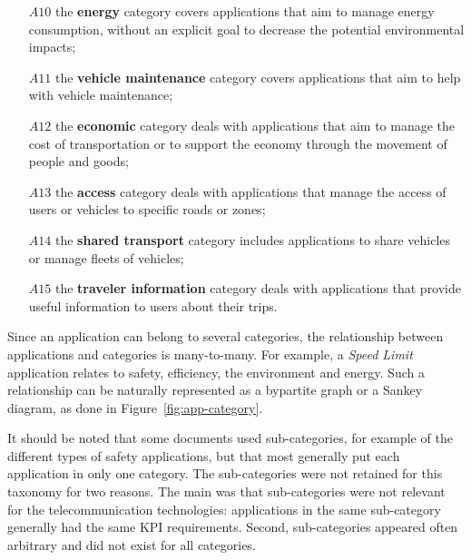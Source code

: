 \begin{enumerate}
\item[$A10$] the \textbf{energy} category covers applications that aim to manage energy consumption, without an explicit goal to decrease the potential environmental impacts;
\item[$A11$] the \textbf{vehicle maintenance} category covers applications that aim to help with vehicle maintenance;
\item[$A12$] the \textbf{economic} category deals with applications that aim to manage the cost of transportation or to support the economy through the movement of people and goods;
\item[$A13$] the \textbf{access} category deals with applications that manage the access of users or vehicles to specific roads or zones; 
\item[$A14$] the \textbf{shared transport} category includes applications to share vehicles or manage fleets of vehicles;
\item[$A15$] the \textbf{traveler information} category deals with applications that provide useful information to users about their trips.
\end{enumerate}

Since an application can belong to several categories, the relationship between applications and categories is many-to-many. For example, a \emph{Speed Limit} application relates to safety, efficiency, the environment and energy. Such a relationship can be naturally represented as a bypartite graph or a Sankey diagram, as done in Figure~\ref{fig:app-category}.

It should be noted that some documents used sub-categories, for example of the different types of safety applications, but that most generally put each application in only one category. The sub-categories were not retained for this taxonomy for two reasons. The main was that sub-categories were not relevant for the telecommunication technologies: applications in the same sub-category generally had the same \acrshort{KPI} requirements. Second, sub-categories appeared often arbitrary and did not exist for all categories. 



